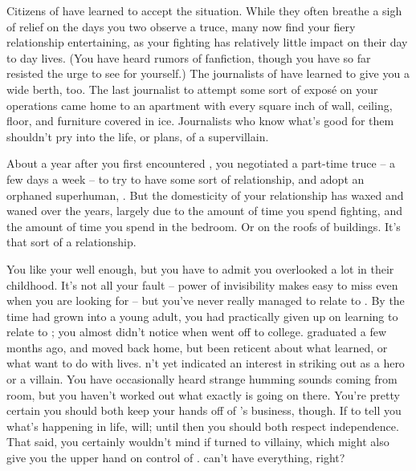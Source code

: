 \documentclass[char]{LRSguildcamp1}
\begin{document}
Citizens of \pCityO{} have learned to accept the situation. While they often breathe a sigh of relief on the days you two observe a truce, many now find your fiery relationship entertaining, as your fighting has relatively little impact on their day to day lives.  (You have heard rumors of fanfiction, though you have so far resisted the urge to see for yourself.)  The journalists of \pCityO{} have learned to give you a wide berth, too.  The last journalist to attempt some sort of expos\'e on your operations came home to an apartment with every square inch of wall, ceiling, floor, and furniture covered in ice.  Journalists who know what's good for them shouldn't pry into the life, or plans, of a supervillain.  

About a year after you first encountered \cOS{}, you negotiated a part-time truce -- a few days a week -- to try to have some sort of relationship, and adopt an orphaned superhuman, \cGrad{}.  
But the domesticity of your relationship has waxed and waned over the years, largely due to the amount of time you spend fighting, and the amount of time you spend in the bedroom.  
Or on the roofs of buildings.  
It's that sort of a relationship.  

You like your \cGrad{\offspring} well enough, but you have to admit you overlooked \cGrad{\them} a lot in their childhood.  
It's not all your fault -- \cGrad{\their} power of invisibility makes \cGrad{\them} easy to miss even when you are looking for \cGrad{\them} -- but you've never really managed to relate to \cGrad{\them}.  
By the time \cGrad{\they} had grown into a young adult, you had practically given up on learning to relate to \cGrad{\them}; you almost didn't notice when \cGrad{} went off to college.  
\cGrad{\They} graduated a few months ago, and moved back home, but \cGrad{\have} been reticent about what \cGrad{\they} learned, or what \cGrad{\they} want to do with \cGrad{\their} lives.  \cGrad{\They} \cGrad{\have}n't yet indicated an interest in striking out as a hero or a villain.  
You have occasionally heard strange humming sounds coming from \cGrad{\their} room, but you haven't worked out what exactly is going on there. %
You're pretty certain you should both keep your hands off of \cGrad{}'s business, though.  If \cGrad{\they} \cGrad{\want} to tell you what's happening in \cGrad{\their} life, \cGrad{\they} will; until then you should both respect \cGrad{\their} independence.  That said, you certainly wouldn't mind if \cGrad{\they} turned to villainy, which might also give you the upper hand on control of \pCityO{}.  \cOS{} can't have everything, right?
\end{document}
